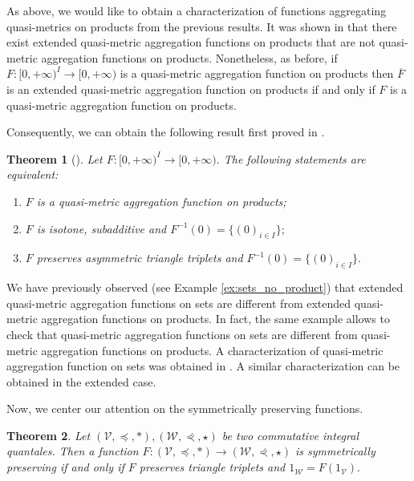 \documentclass[11pt,a4paper]{amsart}
\newtheorem{theorem}{Theorem}[section]
\theoremstyle{definition}
\begin{document}
	
	As above, we would like to obtain a characterization of functions aggregating quasi-metrics on products from the previous results. It was shown in \cite[Example 4]{MassaVale13} that there exist extended quasi-metric aggregation functions on products that are not quasi-metric aggregation functions on products. Nonetheless, as before, if $F:[0,+\infty)^I\to [0,+\infty)$ is a quasi-metric aggregation function on products then $\overline{F}$  is an extended quasi-metric aggregation function on products if and only if $F$ is a quasi-metric aggregation function on products.
	
	
	Consequently, we can obtain the following result first proved in \cite[Theorems 6 and 11]{MayorVale10}.
	
	\begin{theorem}[\cite{MayorVale10}]
		Let $F:[0,+\infty)^I\to [0,+\infty).$ The following statements are equivalent:
		\begin{enumerate}[(1)]
			\item $F$ is a quasi-metric aggregation function on products;
			\item $F$ is isotone, subadditive and $F^{-1}(0)=\{(0)_{i\in I}\};$
			\item $F$ preserves asymmetric triangle triplets and $F^{-1}(0)=\{(0)_{i\in I}\}.$           
		\end{enumerate}
	\end{theorem}
	
	We have previously observed (see Example \ref{ex:sets_no_product}) that extended quasi-metric aggregation functions on sets are different from extended quasi-metric aggregation functions on products. In fact, the same example allows to check that quasi-metric aggregation functions on sets are different from quasi-metric aggregation functions on products. A characterization of quasi-metric aggregation function on sets was obtained in \cite[Theorem 2.6]{MinyaVale19}. A similar characterization can be obtained in the extended case.\medskip
	
	
	Now, we center our attention on the symmetrically preserving functions.
	
	\begin{theorem}\label{thm:symp}
		Let $(\mathscr{V},\preceq,\ast),(\mathscr{W},\curlyeqprec,\star)$ be two commutative integral quantales. Then a function $F:(\mathscr{V},\preceq,\ast)\to(\mathscr{W},\curlyeqprec,\star)$ is symmetrically preserving if and only if $F$ preserves triangle triplets and $1_\mathscr{W}=F(1_\mathscr{V}).$
	\end{theorem}
	
\end{document}
